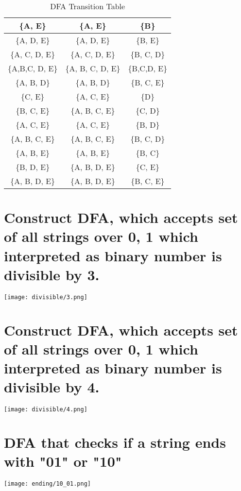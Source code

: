 \documentclass[8pt]{article}
\begin{document}
\begin{table}[H]
\begin{tabular}{|c|c|c|}
        \hline
        \{A, E\} & \{A, E\} & \{B\} \\
        \hline
        \{A, D, E\} & \{A, D, E\} & \{B, E\} \\
        \hline
        \{A, C, D, E\} & \{A, C, D, E\} & \{B, C, D\} \\
        \hline
        \{A,B,C, D, E\} & \{A, B, C, D, E\} & \{B,C,D, E\} \\
        \hline
        \{A, B, D\} & \{A, B, D\} & \{B, C, E\} \\
        \hline
        \{C, E\} & \{A, C, E\} & \{D\} \\
        \hline
        \{B, C, E\} & \{A, B, C, E\} & \{C, D\} \\
        \hline
        \{A, C, E\} & \{A, C, E\} & \{B, D\} \\
        \hline
        \{A, B, C, E\} & \{A, B, C, E\} & \{B, C, D\} \\
        \hline
        \{A, B, E\} & \{A, B, E\} & \{B, C\} \\
        \hline
        \{B, D, E\} & \{A, B, D, E\} & \{C, E\} \\
        \hline
        \{A, B, D, E\} & \{A, B, D, E\} & \{B, C, E\} \\
        \hline
        
    \end{tabular}
    \caption{DFA Transition Table}
    \label{tab:dfa_transition}
\end{table}



\section{Construct DFA, which accepts set of all strings over {0, 1} which interpreted as binary number is divisible by 3. }
\begin{center}
    \texttt{[image: divisible/3.png]} 
\end{center}
\section{Construct DFA, which accepts set of all strings over {0, 1} which interpreted as binary number is divisible by 4. }
\begin{center}
    \texttt{[image: divisible/4.png]} %
\end{center}
\section{ DFA that checks if a string ends with "01" or "10"}
\begin{center}
    \texttt{[image: ending/10\_01.png]} %
\end{center}
\end{document}
